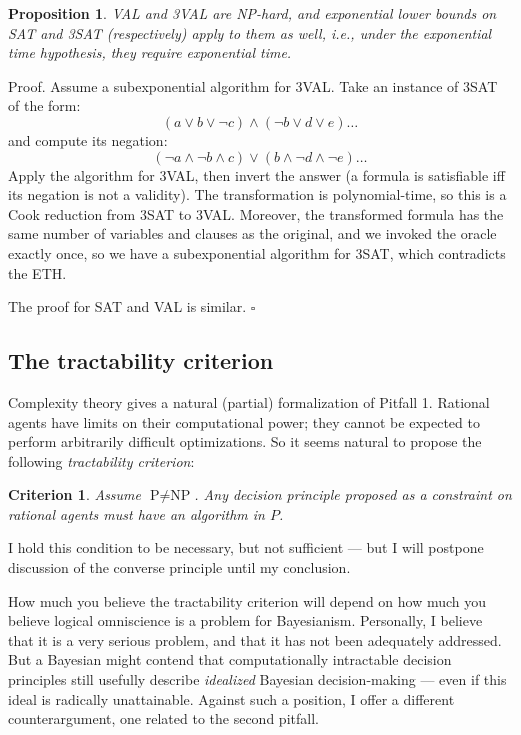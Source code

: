 \documentclass[letterpaper,12pt]{article}
\newtheorem{criterion}{Criterion}
\newtheorem{proposition}{Proposition}
\begin{document}
\begin{proposition}
\label{3ValExpTime}
VAL and 3VAL are NP-hard, and exponential lower bounds on SAT and 3SAT (respectively) apply to them as well, i.e., under the exponential time hypothesis, they require exponential time.
\end{proposition}
Proof. Assume a subexponential algorithm for 3VAL. Take an instance of 3SAT of the form:
$$(a \lor b \lor \neg c) \land (\neg b \lor d \lor e) \ldots$$
and compute its negation:
$$(\neg a \land \neg b \land c) \lor (b \land \neg d \land \neg e) \ldots$$
Apply the algorithm for 3VAL, then invert the answer (a formula is satisfiable iff its negation is not a validity). The transformation is polynomial-time, so this is a Cook reduction from 3SAT to 3VAL. Moreover, the transformed formula has the same number of variables and clauses as the original, and we invoked the oracle exactly once, so we have a subexponential algorithm for 3SAT, which contradicts the ETH.

The proof for SAT and VAL is similar. $\square$

\subsection{The tractability criterion}
Complexity theory gives a natural (partial) formalization of Pitfall 1. Rational agents have limits on their computational power; they cannot be expected to perform arbitrarily difficult optimizations. So it seems natural to propose the following \emph{tractability criterion}:

\begin{criterion}
\label{tractability}
Assume $\text{P} \not = \text{NP}$. Any decision principle proposed as a constraint on rational agents must have an algorithm in $P$.
\end{criterion}

I hold this condition to be necessary, but not sufficient --- but I will postpone discussion of the converse principle until my conclusion.

How much you believe the tractability criterion will depend on how much you believe logical omniscience is a problem for Bayesianism. Personally, I believe that it is a very serious problem, and that it has not been adequately addressed. But a Bayesian might contend that computationally intractable decision principles still usefully describe \emph{idealized} Bayesian decision-making --- even if this ideal is radically unattainable. Against such a position, I offer a different counterargument, one related to the second pitfall. 
\end{document}
